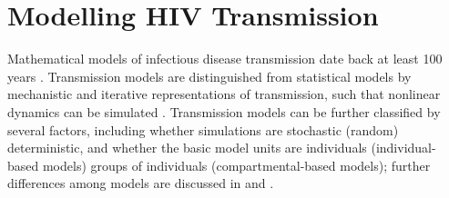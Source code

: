 \section{Modelling HIV Transmission}\label{intro.model} %
Mathematical models of infectious disease transmission
date back at least 100 years \cite{Hethcote2000}.
Transmission models are distinguished from statistical models by
mechanistic and iterative representations of transmission, such that
nonlinear dynamics can be simulated \cite{Garnett2011}.
Transmission models can be further classified by several factors,
including whether simulations are stochastic (random) \vs deterministic,
and whether the basic model units are
individuals (individual-based models) \vs
groups of individuals (compartmental-based models);
further differences among models are discussed in
 and \cite{Garnett2011,Johnson2016mf}.
